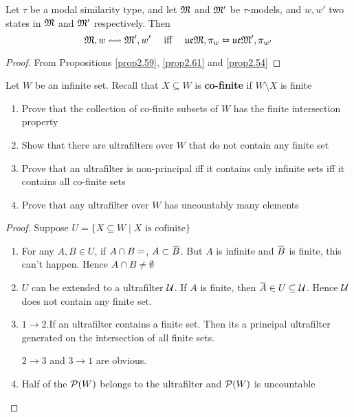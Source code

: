\documentclass[11pt]{article}
\newcommand{\ue}{\fu\fe}
\begin{document}
\begin{theorem}[]
Let \(\tau\) be a modal similarity type, and let \(\mathfrak{M}\) and \(\mathfrak{M}'\) be
\(\tau\)-models, and \(w,w'\) two states in \(\mathfrak{M}\) and \(\mathfrak{M}'\) respectively.
Then
\begin{equation*}
\fM,w\leftrightsquigarrow \fM',w' \quad\text{ iff }\quad
\ue\fM,\pi_w\leftrightarroweq\ue\fM',\pi_{w'}
\end{equation*}
\end{theorem}

\begin{proof}
From Propositions \ref{prop2.59}, \ref{prop2.61} and \ref{prop2.54}
\end{proof}


\begin{exercise}
\label{ex2.5.4}
Let \(W\) be an infinite set. Recall that \(X\subseteq W\) is \textbf{co-finite} if
\(W\setminus X\) is finite
\begin{enumerate}
\item Prove that the collection of co-finite subsets of \(W\) has the finite
intersection property
\item Show that there are ultrafilters over \(W\) that do not contain any
finite set
\item Prove that an ultrafilter is non-principal iff it contains only infinite
sets iff it contains all co-finite sets
\item Prove that any ultrafilter over \(W\) has uncountably many elements
\end{enumerate}
\end{exercise}



\begin{proof}
Suppose \(U=\{X\subseteq W\mid X\text{ is cofinite}\}\)
\begin{enumerate}
\item For any \(A,B\in U\), if \(A\cap B=\empty\), \(A\subset\bbar{B}\). But
\(A\) is infinite and \(\bbar{B}\) is finite, this can't happen. Hence
\(A\cap B\neq\emptyset\)
\item \(U\) can be extended to a ultrafilter \(\mathcal{U}\). If \(A\) is finite, then
\(\bbar{A}\in U\subseteq\calu\). Hence \(\mathcal{U}\) does not contain any
finite set.
\item \(1\to 2\).If an ultrafilter contains a finite set. Then its a principal ultrafilter
generated on the intersection of all finite sets.

\(2\to3\) and \(3\to1\) are obvious.
\item Half of the \(\mathcal{P}(W)\) belongs to the ultrafilter and \(\mathcal{P}(W)\) is uncountable
\end{enumerate}
\end{proof}
\end{document}
